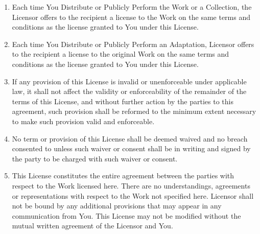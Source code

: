 \begin{enumerate}
          \item Each time You Distribute or Publicly Perform the Work
          or a Collection, the Licensor offers to the recipient a
          license to the Work on the same terms and conditions as
          the license granted to You under this License.

          \item Each time You Distribute or Publicly Perform an
          Adaptation, Licensor offers to the recipient a license to
          the original Work on the same terms and conditions as the
          license granted to You under this License.

          \item If any provision of this License is invalid or
          unenforceable under applicable law, it shall not affect
          the validity or enforceability of the remainder of the
          terms of this License, and without further action by the
          parties to this agreement, such provision shall be
          reformed to the minimum extent necessary to make such
          provision valid and enforceable.

          \item No term or provision of this License shall be deemed
          waived and no breach consented to unless such waiver or
          consent shall be in writing and signed by the party to be
          charged with such waiver or consent.

          \item This License constitutes the entire agreement between
          the parties with respect to the Work licensed here. There
          are no understandings, agreements or representations with
          respect to the Work not specified here. Licensor shall
          not be bound by any additional provisions that may appear
          in any communication from You. This License may not be
          modified without the mutual written agreement of the
          Licensor and You.


\end{enumerate}
